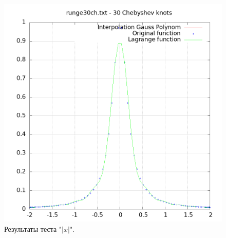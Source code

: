 \documentclass[14pt,a4paper]{extarticle}
\newcommand{\1}{\mathbbm{1}}
\begin{document}
    \begin{figure}
        \centering
        \includegraphics[scale=0.5]{Images/runge30ch.txt.png}
        \caption{Результаты теста "$|x|$".}
    \end{figure}
\end{document}
